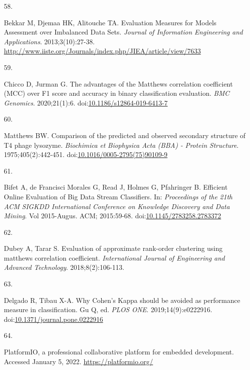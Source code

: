\documentclass[12pt,twoside]{fmupthesis}
\newlength{\csllabelwidth}
\newlength{\cslhangindent}
\newenvironment{CSLReferences}[2] %
 {%
  \setlength{\parindent}{0pt}
  \ifodd #1 \everypar{\setlength{\hangindent}{\cslhangindent}}\ignorespaces\fi
  \ifnum #2 > 0
  \setlength{\parskip}{#2\baselineskip}
  \fi
 }%
 {}
\newcommand{\CSLLeftMargin}[1]{\parbox[t]{\csllabelwidth}{#1}}
\newcommand{\CSLRightInline}[1]{\parbox[t]{\linewidth - \csllabelwidth}{#1}}
\begin{document}
\begin{CSLReferences}{0}{0}
\leavevmode{}%
\CSLLeftMargin{58. }
\CSLRightInline{Bekkar M, Djemaa HK, Alitouche TA. {Evaluation Measures for Models Assessment over Imbalanced Data Sets}. \emph{Journal of Information Engineering and Applications}. 2013;3(10):27-38. \url{http://www.iiste.org/Journals/index.php/JIEA/article/view/7633}}

\leavevmode{}%
\CSLLeftMargin{59. }
\CSLRightInline{Chicco D, Jurman G. {The advantages of the Matthews correlation coefficient (MCC) over F1 score and accuracy in binary classification evaluation}. \emph{BMC Genomics}. 2020;21(1):6. doi:\href{https://doi.org/10.1186/s12864-019-6413-7}{10.1186/s12864-019-6413-7}}

\leavevmode{}%
\CSLLeftMargin{60. }
\CSLRightInline{Matthews BW. {Comparison of the predicted and observed secondary structure of T4 phage lysozyme}. \emph{Biochimica et Biophysica Acta (BBA) - Protein Structure}. 1975;405(2):442-451. doi:\href{https://doi.org/10.1016/0005-2795(75)90109-9}{10.1016/0005-2795(75)90109-9}}

\leavevmode{}%
\CSLLeftMargin{61. }
\CSLRightInline{Bifet A, de Francisci Morales G, Read J, Holmes G, Pfahringer B. {Efficient Online Evaluation of Big Data Stream Classifiers}. In: \emph{Proceedings of the 21th ACM SIGKDD International Conference on Knowledge Discovery and Data Mining}. Vol 2015-Augus. ACM; 2015:59-68. doi:\href{https://doi.org/10.1145/2783258.2783372}{10.1145/2783258.2783372}}

\leavevmode{}%
\CSLLeftMargin{62. }
\CSLRightInline{Dubey A, Tarar S. {Evaluation of approximate rank-order clustering using matthews correlation coefficient}. \emph{International Journal of Engineering and Advanced Technology}. 2018;8(2):106-113.}

\leavevmode{}%
\CSLLeftMargin{63. }
\CSLRightInline{Delgado R, Tibau X-A. {Why Cohen's Kappa should be avoided as performance measure in classification}. Gu Q, ed. \emph{PLOS ONE}. 2019;14(9):e0222916. doi:\href{https://doi.org/10.1371/journal.pone.0222916}{10.1371/journal.pone.0222916}}

\leavevmode{}%
\CSLLeftMargin{64. }
\CSLRightInline{PlatformIO, a professional collaborative platform for embedded development. Accessed January 5, 2022. \url{https://platformio.org/}}


\end{CSLReferences}
\end{document}
